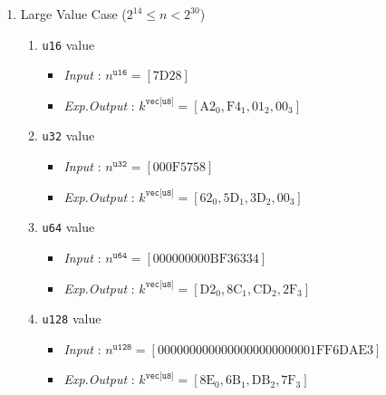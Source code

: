 \documentclass[../alan-handbook.tex]{subfiles}
\begin{document}
\begin{enumerate}
    \item Large Value Case ($2^{14} \leq n < 2^{30}$)
        \begin{enumerate}
            \item \texttt{u16} value
                \begin{itemize}
                    \item \textit{Input} : $n^{\texttt{u16}} = [\text{7D28}]$
                    \item \textit{Exp.Output} : $k^{\texttt{vec[u8]}} = [\text{A2}_0,\text{F4}_1,\text{01}_2,\text{00}_3]$
                \end{itemize}
            \item \texttt{u32} value
                \begin{itemize}
                    \item \textit{Input} : $n^{\texttt{u32}} = [\text{000F5758}]$
                    \item \textit{Exp.Output} : $k^{\texttt{vec[u8]}} = [\text{62}_0,\text{5D}_1,\text{3D}_2,\text{00}_3]$
                \end{itemize}
            \item \texttt{u64} value
                \begin{itemize}
                    \item \textit{Input} : $n^{\texttt{u64}} = [\text{000000000BF36334}]$
                    \item \textit{Exp.Output} : $k^{\texttt{vec[u8]}} = [\text{D2}_0,\text{8C}_1,\text{CD}_2,\text{2F}_3]$
                \end{itemize}
            \item \texttt{u128} value
                \begin{itemize}
                    \item \textit{Input} : $n^{\texttt{u128}} = [\text{0000000000000000000000001FF6DAE3}]$
                    \item \textit{Exp.Output} : $k^{\texttt{vec[u8]}} = [\text{8E}_0,\text{6B}_1,\text{DB}_2,\text{7F}_3]$
                \end{itemize}
        \end{enumerate}
    

\end{enumerate}
\end{document}
